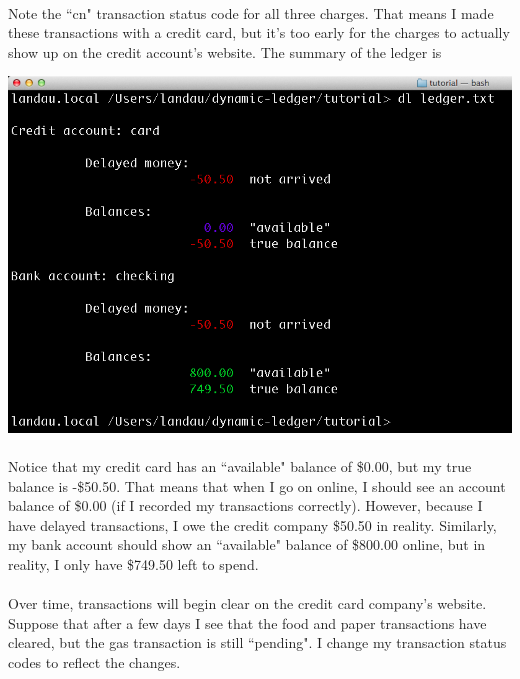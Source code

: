 \documentclass{article}
\providecommand{\q}{$\quad$ \newline}
\begin{document}
\begin{flushleft}
\paragraph{} Note the ``cn" transaction status code for all three charges. That means I made these transactions with a credit card, but it's too early for the charges to actually show up on the credit account's website. The summary of the ledger is \q

\begin{center}
\includegraphics[scale=.45]{fig/sum3.png}
\end{center} 

\paragraph{} Notice that my credit card has an ``available" balance of \$0.00, but my true balance is -\$50.50. That means that when I go on online, I should see an account balance of  \$0.00 (if I recorded my transactions correctly). However, because I have delayed transactions, I owe the credit company \$50.50 in reality. Similarly, my bank account should show an ``available" balance of \$800.00 online, but in reality, I only have \$749.50 left to spend. 

\paragraph{} Over time, transactions will begin clear on the credit card company's website. Suppose that after a few days I see that the food and paper transactions have cleared, but the gas transaction is still ``pending". I change my transaction status codes to reflect the changes.


\end{flushleft}
\end{document}
